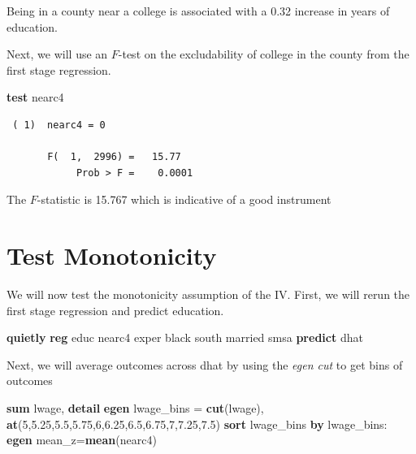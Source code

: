 \documentclass[
]{book}
\newenvironment{Shaded}{\begin{snugshade}}{\end{snugshade}}
\newcommand{\BaseNTok}[1]{\textcolor[rgb]{0.00,0.00,0.81}{#1}}
\newcommand{\FunctionTok}[1]{\textcolor[rgb]{0.13,0.29,0.53}{\textbf{#1}}}
\newcommand{\KeywordTok}[1]{\textcolor[rgb]{0.13,0.29,0.53}{\textbf{#1}}}
\newcommand{\NormalTok}[1]{#1}
\begin{document}
Being in a county near a college is associated with a 0.32 increase in years of education.

Next, we will use an \(F\)-test on the excludability of college in the county from the first stage regression.

\begin{Shaded}
\begin{Highlighting}[]
\KeywordTok{test}\NormalTok{ nearc4}
\end{Highlighting}
\end{Shaded}

\begin{verbatim}
 ( 1)  nearc4 = 0

       F(  1,  2996) =   15.77
            Prob > F =    0.0001
\end{verbatim}

The \(F\)-statistic is 15.767 which is indicative of a good instrument

\section{Test Monotonicity}\label{test-monotonicity}

We will now test the monotonicity assumption of the IV. First, we will rerun the first stage regression and predict education.

\begin{Shaded}
\begin{Highlighting}[]
\KeywordTok{quietly} \KeywordTok{reg}\NormalTok{ educ nearc4 exper }\BaseNTok{black}\NormalTok{ south married smsa}
\KeywordTok{predict}\NormalTok{ dhat}
\end{Highlighting}
\end{Shaded}

Next, we will average outcomes across dhat by using the \emph{egen cut} to get bins of outcomes

\begin{Shaded}
\begin{Highlighting}[]
\KeywordTok{sum}\NormalTok{ lwage, }\KeywordTok{detail}
\KeywordTok{egen}\NormalTok{ lwage\_bins = }\FunctionTok{cut}\NormalTok{(lwage), }\FunctionTok{at}\NormalTok{(5,5.25,5.5,5.75,6,6.25,6.5,6.75,7,7.25,7.5)}
\KeywordTok{sort}\NormalTok{ lwage\_bins}
\KeywordTok{by}\NormalTok{ lwage\_bins: }\KeywordTok{egen}\NormalTok{ mean\_z=}\KeywordTok{mean}\NormalTok{(nearc4)}
\end{Highlighting}
\end{Shaded}
\end{document}
